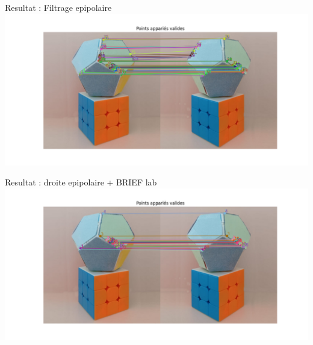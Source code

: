 \begin{frame}{Resultat : Filtrage epipolaire}
  \hspace*{-1cm}
  \includegraphics[width=1.1\linewidth]{capture/sans_brief.png}\\[0.5em]
\end{frame}

\begin{frame}{Resultat : droite epipolaire + BRIEF lab}
  \hspace*{-1cm}
  \includegraphics[width=1.1\linewidth]{capture/avec_brief.png}\\[0.5em]
\end{frame}
